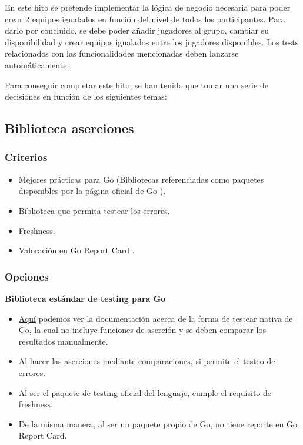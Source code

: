 En este hito se pretende implementar la lógica de negocio necesaria para poder crear 2 equipos igualados en función del nivel de todos los participantes.
Para darlo por concluido, se debe poder añadir jugadores al grupo, cambiar su disponibilidad y crear equipos igualados entre los jugadores disponibles.
Los tests relacionados con las funcionalidades mencionadas deben lanzarse automáticamente.

Para conseguir completar este hito, se han tenido que tomar una serie de decisiones en función de los siguientes temas:

\subsection{Biblioteca aserciones}

\subsubsection{Criterios}

\begin{itemize}
\item
  Mejores prácticas para Go (Bibliotecas referenciadas como paquetes
  disponibles por la página oficial de Go \cite{go-dev}).
\item
  Biblioteca que permita testear los errores.
\item
  Freshness.
\item
  Valoración en Go Report Card \cite{go-report-card}.
\end{itemize}

\subsubsection{Opciones}

\textbf{Biblioteca estándar de testing para
Go}

\begin{itemize}
\item
  \href{https://pkg.go.dev/testing}{Aquí} \cite{go-dev} podemos ver la documentación
  acerca de la forma de testear nativa de Go, la cual no incluye
  funciones de aserción y se deben comparar los resultados manualmente.
\item
  Al hacer las aserciones mediante comparaciones, si permite el testeo
  de errores.
\item
  Al ser el paquete de testing oficial del lenguaje, cumple el requisito
  de freshness.
\item
  De la misma manera, al ser un paquete propio de Go, no tiene reporte
  en Go Report Card.
\end{itemize}


